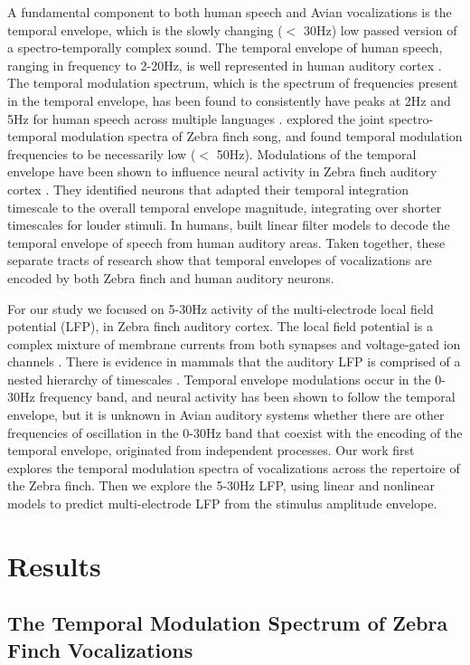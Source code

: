 A fundamental component to both human speech and Avian vocalizations is the temporal envelope, which is the slowly changing ($<$ 30Hz) low passed version of a spectro-temporally complex sound. The temporal envelope of human speech, ranging in frequency to 2-20Hz, is well represented in human auditory cortex \cite{Aiken2008}. The temporal modulation spectrum, which is the spectrum of frequencies present in the temporal envelope, has been found to consistently have peaks at 2Hz and 5Hz for human speech across multiple languages \cite{Ding2016}. \cite{Singh2003} explored the joint spectro-temporal modulation spectra of Zebra finch song, and found temporal modulation frequencies to be necessarily low ($<$ 50Hz).
Modulations of the temporal envelope have been shown to influence neural activity in Zebra finch auditory cortex \cite{Nagel2006}. They identified neurons that adapted their temporal integration timescale to the overall temporal envelope magnitude, integrating over shorter timescales for louder stimuli. In humans, \cite{Pasley2012} built linear filter models to decode the temporal envelope of speech from human auditory areas. Taken together, these separate tracts of research show that temporal envelopes of vocalizations are encoded by both Zebra finch and human auditory neurons.

For our study we focused on 5-30Hz activity of the multi-electrode local field potential (LFP), in Zebra finch auditory cortex. The local field potential is a complex mixture of membrane currents from both synapses and voltage-gated ion channels \cite{Buzsaki2012b}. There is evidence in mammals that the auditory LFP is comprised of a nested hierarchy of timescales \cite{Lakatos2005}. Temporal envelope modulations occur in the 0-30Hz frequency band, and neural activity has been shown to follow the temporal envelope, but it is unknown in Avian auditory systems whether there are other frequencies of oscillation in the 0-30Hz band that coexist with the encoding of the temporal envelope, originated from independent processes. Our work first explores the temporal modulation spectra of vocalizations across the repertoire of the Zebra finch. Then we explore the 5-30Hz LFP, using linear and nonlinear models to predict multi-electrode LFP from the stimulus amplitude envelope.

\section{Results}

\subsection{The Temporal Modulation Spectrum of Zebra Finch Vocalizations}

